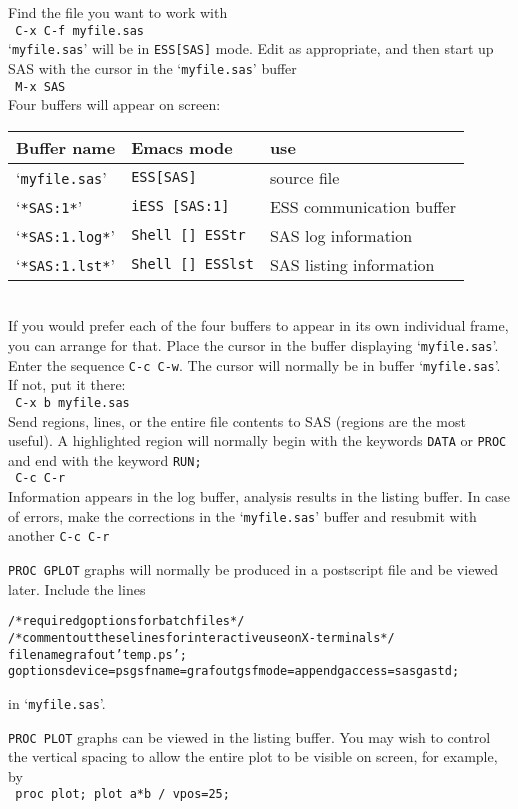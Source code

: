 \documentclass{article}
\newcommand{\stexttt}[1]{{\small\texttt{#1}}}
\newcommand{\elcode}[1]{\\{\stexttt{\hspace*{2em} #1}}\\}
\newenvironment{Salltt}{\small\begin{alltt}}{\end{alltt}}
\newcommand{\file}[1]{`\stexttt{#1}'}
\begin{document}
Find the file you want to work with
    \elcode{C-x C-f myfile.sas}
\file{myfile.sas} will be in \stexttt{ESS[SAS]} mode.
Edit as appropriate, and then start up SAS with the cursor in
the \file{myfile.sas} buffer
    \elcode{M-x SAS}
Four buffers will appear on screen:\\
\begin{tabular}{lll}  \hline
  Buffer name     & Emacs mode         & use\\  \hline
  \file{myfile.sas}  & \stexttt{ESS[SAS]}       &source file   \\
  \file{*SAS:1*}     & \stexttt{iESS [SAS:1]}   &ESS communication buffer \\
  \file{*SAS:1.log*} & \stexttt{Shell [] ESStr} &SAS log information      \\
  \file{*SAS:1.lst*} & \stexttt{Shell [] ESSlst}&SAS listing information  \\
  \hline
\end{tabular}\\[1ex]
If you would prefer each of the four buffers to appear in its own
individual frame, you can arrange for that.  Place the cursor in the
buffer displaying \file{myfile.sas}.  Enter the sequence \stexttt{C-c C-w}.
The cursor will normally be in buffer \file{myfile.sas}.  If
not, put it there:
    \elcode{C-x b myfile.sas}
Send regions, lines, or the entire file contents to SAS
(regions are the most useful).  A highlighted region will normally
begin with the keywords \stexttt{DATA} or \stexttt{PROC} and end with the
keyword \stexttt{RUN;}
    \elcode{C-c C-r}
Information appears in the log buffer, analysis results in the
listing buffer.  In case of errors, make the corrections in the
\file{myfile.sas} buffer and resubmit with another \stexttt{C-c C-r}

\stexttt{PROC GPLOT} graphs will normally be produced in a postscript
file and be viewed later.  Include the lines
\begin{Salltt}
    /* required goptions for batch files */
    /* comment out these lines for interactive use on X-terminals*/
    filename grafout 'temp.ps';
    goptions device=ps gsfname=grafout gsfmode=append gaccess=sasgastd;
\end{Salltt}
\noindent
in \file{myfile.sas}.

\stexttt{PROC PLOT} graphs can be viewed in the listing buffer.  You
may wish to control the vertical spacing to allow the entire plot to
be visible on screen, for example, by
\elcode{proc plot; plot a*b / vpos=25;}
 
\end{document}
